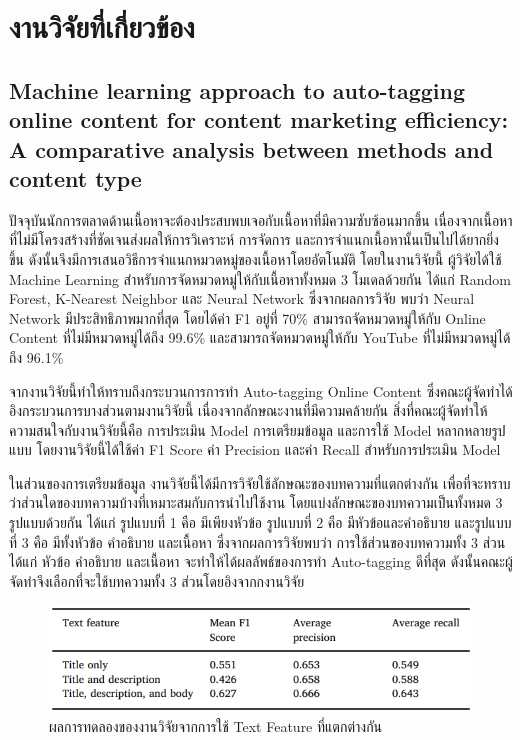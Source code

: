 \documentclass[12pt,oneside,openright,a4paper]{cpe-thai-project}
\begin{document}
\section{งานวิจัยที่เกี่ยวข้อง}
  \subsection{Machine learning approach to auto-tagging online content for content marketing efficiency:
    A comparative analysis between methods and content type}
    \hspace{1cm}ปัจจุบันนักการตลาดด้านเนื้อหาจะต้องประสบพบเจอกับเนื้อหาที่มีความซับซ้อนมากขึ้น 
    เนื่องจากเนื้อหาที่ไม่มีโครงสร้างที่ชัดเจนส่งผลให้การวิเคราะห์ การจัดการ และการจำแนกเนื้อหานั้นเป็นไปได้ยากยิ่งขึ้น 
    ดังนั้นจึงมีการเสนอวิธีการจำแนกหมวดหมู่ของเนื้อหาโดยอัตโนมัติ 
    โดยในงานวิจัยนี้ ผู้วิจัยได้ใช้ Machine Learning สำหรับการจัดหมวดหมู่ให้กับเนื้อหาทั้งหมด 3 โมเดลด้วยกัน ได้แก่
    Random Forest, K-Nearest Neighbor และ Neural Network 
    ซึ่งจากผลการวิจัย พบว่า Neural Network มีประสิทธิภาพมากที่สุด โดยได้ค่า F1 อยู่ที่ 70\%  
    สามารถจัดหมวดหมู่ให้กับ Online Content ที่ไม่มีหมวดหมู่ได้ถึง 99.6\% และสามารถจัดหมวดหมู่ให้กับ YouTube ที่ไม่มีหมวดหมู่ได้ถึง 96.1\% \cite{three_model}  

    \hspace{1cm}จากงานวิจัยนี้ทำให้ทราบถึงกระบวนการการทำ Auto-tagging Online Content ซึ่งคณะผู้จัดทำได้อิงกระบวนการบางส่วนตามงานวิจัยนี้
    เนื่องจากลักษณะงานที่มีความคล้ายกัน สิ่งที่คณะผู้จัดทำให้ความสนใจกับงานวิจัยนี้คือ การประเมิน Model การเตรียมข้อมูล และการใช้ Model หลากหลายรูปแบบ
    โดยงานวิจัยนี้ได้ใช้ค่า F1 Score ค่า Precision และค่า Recall สำหรับการประเมิน Model
    
    \hspace{1cm}ในส่วนของการเตรียมข้อมูล งานวิจัยนี้ได้มีการวิจัยใช้ลักษณะของบทความที่แตกต่างกัน เพื่อที่จะทราบว่าส่วนใดของบทความบ้างที่เหมาะสมกับการนำไปใช้งาน 
    โดยแบ่งลักษณะของบทความเป็นทั้งหมด 3 รูปแบบด้วยกัน ได้แก่ รูปแบบที่ 1 คือ มีเพียงหัวข้อ รูปแบบที่ 2 คือ มีหัวข้อและคำอธิบาย และรูปแบบที่ 3 คือ มีทั้งหัวข้อ คำอธิบาย และเนื้อหา
    ซึ่งจากผลการวิจัยพบว่า การใช้ส่วนของบทความทั้ง 3 ส่วน ได้แก่ หัวข้อ คำอธิบาย และเนื้อหา จะทำให้ได้ผลลัพธ์ของการทำ Auto-tagging ดีที่สุด 
    ดังนั้นคณะผู้จัดทำจึงเลือกที่จะใช้บทความทั้ง 3 ส่วนโดยอิงจากกงานวิจัย

    \begin{figure}[!ht]\centering
      \includegraphics[width=13cm]{./img/text_feature.png}
      \caption{ผลการทดลองของงานวิจัยจากการใช้ Text Feature ที่แตกต่างกัน}\label{fig:feature}
    \end{figure}
\end{document}
